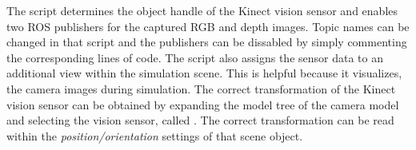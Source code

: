 The script determines the object handle of the Kinect vision sensor and enables two ROS publishers for the captured RGB and depth images. Topic names can be changed in that script and the publishers can be dissabled by simply commenting the corresponding lines of code. The script also assigns the sensor data to an additional view within the simulation scene. This is helpful because it visualizes, the camera images during simulation. The correct transformation of the Kinect vision sensor can be obtained by expanding the model tree of the camera model and selecting the vision sensor, called . The correct transformation can be read within the \emph{position/orientation} settings of that scene object.
